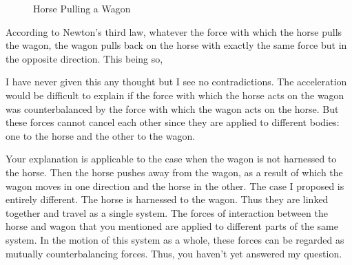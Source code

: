 \begin{p}
\begin{figure}[H]

\caption{Horse Pulling a Wagon}
\label{fig:22}
\end{figure}

According to Newton’s third law, whatever the force with which the horse pulls the wagon, the wagon pulls back on the horse with exactly the same force but in the opposite direction. This being so, 
\end{p}




\begin{s}
I have never given this any thought but I see no contradictions. The acceleration would be difficult to explain if the force with which the horse acts on the wagon was counterbalanced by the force with which the wagon acts on the horse. But these forces cannot cancel each other since they are applied to different bodies: one to the horse and the other to the wagon.
\end{s}


\begin{p}
Your explanation is applicable to the case when the wagon is not harnessed to the horse. Then the horse pushes away from the wagon, as a result of which the wagon moves in one direction and the horse in the other. The case I proposed is entirely different. The horse is harnessed to the wagon. Thus they are linked together and travel as a single system. The forces of interaction between the horse and wagon that you mentioned are applied to different parts of the same system. In the motion of this system as a whole, these forces can be regarded as mutually counterbalancing forces. Thus, you haven't yet answered my question.
\end{p}



